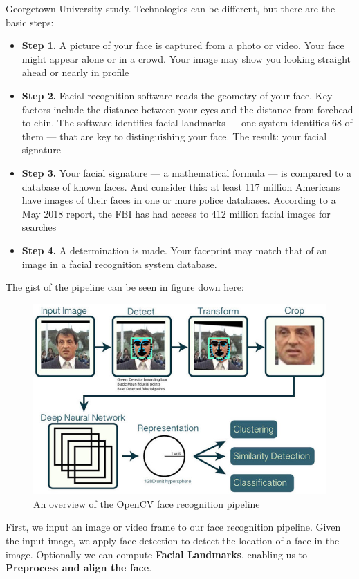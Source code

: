     Georgetown University study. Technologies can be different, but there are the basic steps:
    \begin{itemize}
        \item \textbf{Step 1.} A picture of your face is captured from a photo or video. Your face might appear alone or in a crowd. Your image may show you looking straight 
        ahead or nearly in profile
        \item \textbf{Step 2.} Facial recognition software reads the geometry of your face. Key factors include the distance between your eyes and the distance from forehead to chin. 
        The software identifies facial landmarks — one system identifies 68 of them — that are key to distinguishing your face. The result: your facial signature
        \item \textbf{Step 3.} Your facial signature — a mathematical formula — is compared to a database of known faces. And consider this: at least 117 million Americans have images 
        of their faces in one or more police databases. According to a May 2018 report, the FBI has had access to 412 million facial images for searches
        \item \textbf{Step 4.} A determination is made. Your faceprint may match that of an image in a facial recognition system database.
    \end{itemize}
    The gist of the pipeline can be seen in figure down here: 
    \begin{figure}[H]
        \centering
        \includegraphics[width=0.6\linewidth]{img/opencv.jpg}
        \caption{An overview of the OpenCV face recognition pipeline}
    \end{figure}
    First, we input an image or video frame to our face recognition pipeline. Given the input image, we apply face detection to detect the location of a face in the image. Optionally 
    we can compute \textbf{Facial Landmarks}, enabling us to \textbf{Preprocess and align the face}. \\ 
    \vspace{3mm}

